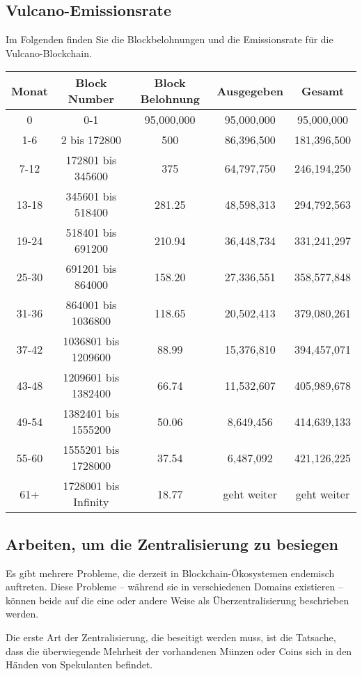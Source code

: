 \documentclass[A4paper, 12pt]{article}
\begin{document}
\subsection{Vulcano-Emissionsrate}
Im Folgenden finden Sie die Blockbelohnungen und die Emissionsrate für die Vulcano-Blockchain. 
\begin{table}[h]
\centering
\begin{tabular}{@{}ccccc@{}}
\toprule
Monat & Block Number & Block Belohnung & Ausgegeben & Gesamt \\ \midrule
0 & 0-1 & 95,000,000 & 95,000,000 & 95,000,000 \\
1-6 & 2 bis 172800 & 500 & 86,396,500 & 181,396,500 \\
7-12 & 172801 bis 345600 & 375 & 64,797,750 & 246,194,250 \\
13-18 & 345601 bis 518400 & 281.25 & 48,598,313 & 294,792,563 \\
19-24 & 518401 bis 691200 & 210.94 & 36,448,734 & 331,241,297 \\
25-30 & 691201 bis 864000 & 158.20 & 27,336,551 & 358,577,848 \\
31-36 & 864001 bis 1036800 & 118.65 & 20,502,413 & 379,080,261 \\
37-42 & 1036801 bis 1209600 & 88.99 & 15,376,810 & 394,457,071 \\
43-48 & 1209601 bis 1382400 & 66.74 & 11,532,607 & 405,989,678 \\
49-54 & 1382401 bis 1555200 & 50.06 & 8,649,456 & 414,639,133 \\
55-60 & 1555201 bis 1728000 & 37.54 & 6,487,092 & 421,126,225 \\
61+ & 1728001 bis Infinity & 18.77 & geht weiter & geht weiter \\ \bottomrule
\end{tabular}
\end{table}

\subsection{Arbeiten, um die Zentralisierung zu besiegen}
Es gibt mehrere Probleme, die derzeit in Blockchain-Ökosystemen endemisch auftreten. Diese Probleme – während sie in verschiedenen Domains existieren – können beide auf die eine oder andere Weise als Überzentralisierung beschrieben werden. 

Die erste Art der Zentralisierung, die beseitigt werden muss, ist die Tatsache, dass die überwiegende Mehrheit der vorhandenen Münzen oder Coins sich in den Händen von Spekulanten befindet. 
\end{document}
